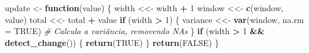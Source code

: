 \documentclass[
]{article}
\newenvironment{Shaded}{\begin{snugshade}}{\end{snugshade}}
\newcommand{\AttributeTok}[1]{\textcolor[rgb]{0.13,0.29,0.53}{#1}}
\newcommand{\CommentTok}[1]{\textcolor[rgb]{0.56,0.35,0.01}{\textit{#1}}}
\newcommand{\ConstantTok}[1]{\textcolor[rgb]{0.56,0.35,0.01}{#1}}
\newcommand{\ControlFlowTok}[1]{\textcolor[rgb]{0.13,0.29,0.53}{\textbf{#1}}}
\newcommand{\DecValTok}[1]{\textcolor[rgb]{0.00,0.00,0.81}{#1}}
\newcommand{\FunctionTok}[1]{\textcolor[rgb]{0.13,0.29,0.53}{\textbf{#1}}}
\newcommand{\NormalTok}[1]{#1}
\newcommand{\OtherTok}[1]{\textcolor[rgb]{0.56,0.35,0.01}{#1}}
\newcommand{\SpecialCharTok}[1]{\textcolor[rgb]{0.81,0.36,0.00}{\textbf{#1}}}
\begin{document}
\begin{Shaded}
\begin{Highlighting}[]
\NormalTok{  update }\OtherTok{\textless{}{-}} \ControlFlowTok{function}\NormalTok{(value) \{}
\NormalTok{    width }\OtherTok{\textless{}\textless{}{-}}\NormalTok{ width }\SpecialCharTok{+} \DecValTok{1}
\NormalTok{    window }\OtherTok{\textless{}\textless{}{-}} \FunctionTok{c}\NormalTok{(window, value)}
\NormalTok{    total }\OtherTok{\textless{}\textless{}{-}}\NormalTok{ total }\SpecialCharTok{+}\NormalTok{ value}
    \ControlFlowTok{if}\NormalTok{ (width }\SpecialCharTok{\textgreater{}} \DecValTok{1}\NormalTok{) \{}
\NormalTok{      variance }\OtherTok{\textless{}\textless{}{-}} \FunctionTok{var}\NormalTok{(window, }\AttributeTok{na.rm =} \ConstantTok{TRUE}\NormalTok{) }\CommentTok{\# Calcula a variância, removendo NAs}
\NormalTok{    \}}
    \ControlFlowTok{if}\NormalTok{ (width }\SpecialCharTok{\textgreater{}} \DecValTok{1} \SpecialCharTok{\&\&} \FunctionTok{detect\_change}\NormalTok{()) \{}
      \FunctionTok{return}\NormalTok{(}\ConstantTok{TRUE}\NormalTok{)}
\NormalTok{    \}}
    \FunctionTok{return}\NormalTok{(}\ConstantTok{FALSE}\NormalTok{)}
\NormalTok{  \}}
  

\end{Highlighting}
\end{Shaded}
\end{document}
